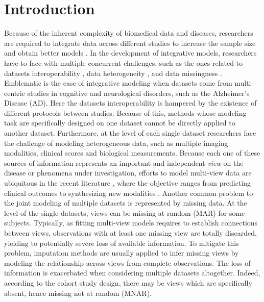 \section{Introduction}

Because of the inherent complexity of biomedical data and diseases,
researchers are required to integrate data across different studies to increase the sample size and obtain better models \citep{LeSueur2020}.
%
In the development of integrative models, researchers have to face with multiple concurrent challenges, such as the ones related to
datasets interoperability \citep{Tognin2020},
data heterogeneity \citep{Buch2020},
and data missingness \citep{GolrizKhatami2020}.
%
Emblematic is the case of integrative modeling when datasets come from multi-centric studies in cognitive and neurological disorders,
such as the Alzheimer's Disease (AD).
%
Here the datasets interoperability is hampered by the existence of different protocols between studies.
Because of this, methods whose modeling task are specifically designed on one dataset cannot be directly applied to another dataset.
%
Furthermore, at the level of each single dataset researchers face the challenge of modeling heterogeneous data,
such as multiple imaging modalities, clinical scores and biological measurements.
Because each one of these sources of information represents an important and independent \textit{view} on the disease or phenomena under investigation,
efforts to model multi-view data are ubiquitous in the recent literature \citep{Vieira2020}, where the objective ranges from predicting clinical outcomes \citep{Chen2019} to synthesizing new modalities \citep{Zhou2020, Wei2019}.
%
Another common problem to the joint modeling of multiple datasets is represented by missing data.
At the level of the single datasets, views can be missing at random (MAR) for some subjects.
Typically, as fitting multi-view models requires to establish connections between views, observations with at least one missing view are totally discarded, yielding to potentially severe loss of available information.
To mitigate this problem, imputation methods are usually applied to infer missing views by modeling the relationship across views from complete observations.
%
The loss of information is exacerbated when considering multiple datasets altogether.
Indeed, according to the cohort study design, there may be views which are specifically absent, hence missing not at random (MNAR).
